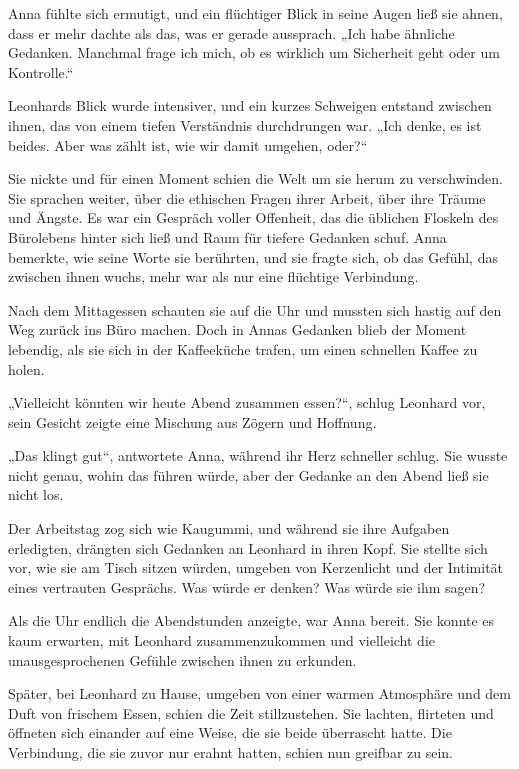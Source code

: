 \documentclass[
]{article}
\begin{document}
Anna fühlte sich ermutigt, und ein flüchtiger Blick in seine Augen ließ
sie ahnen, dass er mehr dachte als das, was er gerade aussprach. „Ich
habe ähnliche Gedanken. Manchmal frage ich mich, ob es wirklich um
Sicherheit geht oder um Kontrolle.``

Leonhards Blick wurde intensiver, und ein kurzes Schweigen entstand
zwischen ihnen, das von einem tiefen Verständnis durchdrungen war. „Ich
denke, es ist beides. Aber was zählt ist, wie wir damit umgehen,
oder?{\kern0pt}``

Sie nickte und für einen Moment schien die Welt um sie herum zu
verschwinden. Sie sprachen weiter, über die ethischen Fragen ihrer
Arbeit, über ihre Träume und Ängste. Es war ein Gespräch voller
Offenheit, das die üblichen Floskeln des Bürolebens hinter sich ließ und
Raum für tiefere Gedanken schuf. Anna bemerkte, wie seine Worte sie
berührten, und sie fragte sich, ob das Gefühl, das zwischen ihnen wuchs,
mehr war als nur eine flüchtige Verbindung.

Nach dem Mittagessen schauten sie auf die Uhr und mussten sich hastig
auf den Weg zurück ins Büro machen. Doch in Annas Gedanken blieb der
Moment lebendig, als sie sich in der Kaffeeküche trafen, um einen
schnellen Kaffee zu holen.

„Vielleicht könnten wir heute Abend zusammen essen?{\kern0pt}``, schlug
Leonhard vor, sein Gesicht zeigte eine Mischung aus Zögern und Hoffnung.

„Das klingt gut``, antwortete Anna, während ihr Herz schneller schlug.
Sie wusste nicht genau, wohin das führen würde, aber der Gedanke an den
Abend ließ sie nicht los.

Der Arbeitstag zog sich wie Kaugummi, und während sie ihre Aufgaben
erledigten, drängten sich Gedanken an Leonhard in ihren Kopf. Sie
stellte sich vor, wie sie am Tisch sitzen würden, umgeben von
Kerzenlicht und der Intimität eines vertrauten Gesprächs. Was würde er
denken? Was würde sie ihm sagen?

Als die Uhr endlich die Abendstunden anzeigte, war Anna bereit. Sie
konnte es kaum erwarten, mit Leonhard zusammenzukommen und vielleicht
die unausgesprochenen Gefühle zwischen ihnen zu erkunden.

Später, bei Leonhard zu Hause, umgeben von einer warmen Atmosphäre und
dem Duft von frischem Essen, schien die Zeit stillzustehen. Sie lachten,
flirteten und öffneten sich einander auf eine Weise, die sie beide
überrascht hatte. Die Verbindung, die sie zuvor nur erahnt hatten,
schien nun greifbar zu sein.
\end{document}
